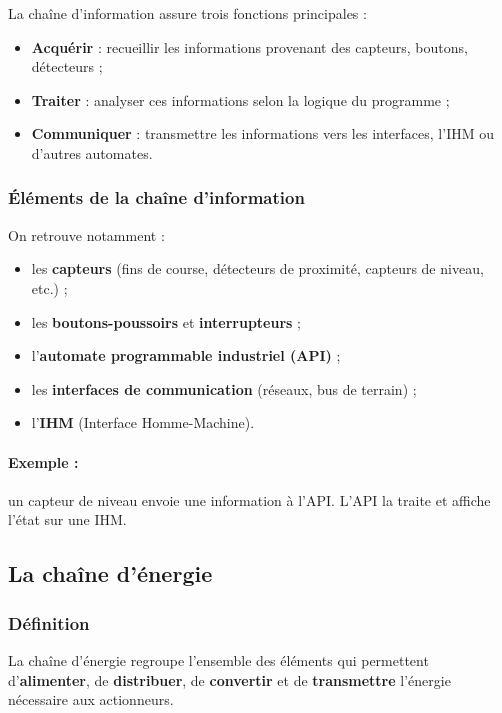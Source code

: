 La chaîne d'information assure trois fonctions principales :

\begin{itemize}
    \item \textbf{Acquérir} : recueillir les informations provenant des capteurs, boutons, détecteurs ;
    \item \textbf{Traiter} : analyser ces informations selon la logique du programme ;
    \item \textbf{Communiquer} : transmettre les informations vers les interfaces, l'IHM ou d'autres automates.
\end{itemize}

\subsubsection{Éléments de la chaîne d'information}

On retrouve notamment :

\begin{itemize}
    \item les \textbf{capteurs} (fins de course, détecteurs de proximité, capteurs de niveau, etc.) ;
    \item les \textbf{boutons-poussoirs} et \textbf{interrupteurs} ;
    \item l'\textbf{automate programmable industriel (API)} ;
    \item les \textbf{interfaces de communication} (réseaux, bus de terrain) ;
    \item l'\textbf{IHM} (Interface Homme-Machine).
\end{itemize}

\paragraph{Exemple :} un capteur de niveau envoie une information à l'API. L'API la traite et affiche l'état sur une IHM.

\subsection{La chaîne d'énergie}

\subsubsection{Définition}

La chaîne d'énergie regroupe l'ensemble des éléments qui permettent d'\textbf{alimenter}, de \textbf{distribuer}, de \textbf{convertir} et de \textbf{transmettre} l'énergie nécessaire aux actionneurs.

